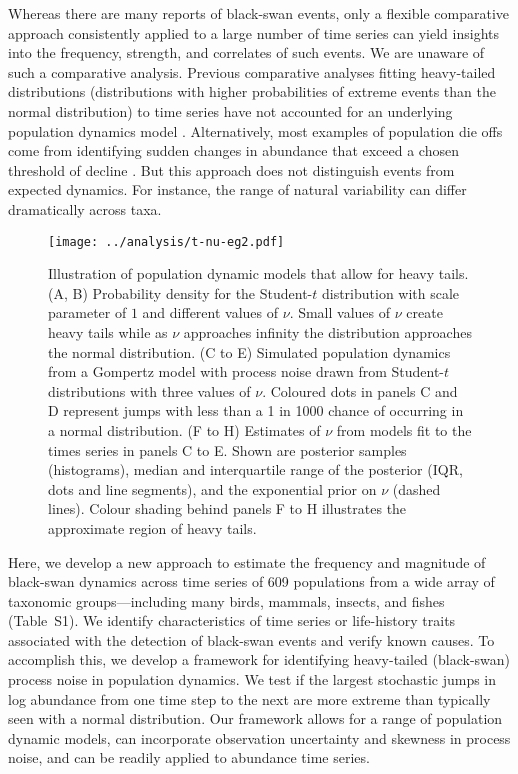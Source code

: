\documentclass[9pt,twocolumn,twoside]{pnas-new}
\begin{document}
Whereas there are many reports of black-swan events,
only a flexible comparative approach consistently applied
to a large number of time series can yield insights into the frequency, strength,
and correlates of such events.
We are unaware of such a comparative analysis.
Previous comparative analyses fitting
heavy-tailed distributions
(distributions with higher probabilities of extreme events
than the normal distribution)
to time series
have not accounted for an underlying population dynamics model
\cite{keitt1998, allen2001, halley2002, segura2013}.
Alternatively, most examples of population die offs come from identifying
sudden changes in abundance that exceed a chosen threshold of decline
\cite{young1994, gerber2001, reed2003, fey2015}.
But this approach
does not distinguish events from
expected dynamics.
For instance, the range of natural variability
can differ dramatically across taxa.

\begin{figure*}[htb]
\centering
\texttt{[image: ../analysis/t-nu-eg2.pdf]}
\caption{Illustration of population dynamic models that allow for heavy
tails. (A, B) Probability density for the Student-$t$
distribution with scale parameter of $1$ and different values of \(\nu\). Small
values of \(\nu\) create heavy tails while as \(\nu\) approaches infinity the
distribution approaches the normal distribution. (C to E)
Simulated population dynamics from a Gompertz model with process noise drawn
from Student-$t$ distributions with three values of \(\nu\). Coloured dots in
panels C and D represent jumps with less than a 1 in 1000
chance of occurring in a normal distribution. (F to H)
Estimates of \(\nu\) from models fit to the times series in panels C to
E. Shown are posterior samples (histograms), median and interquartile
range of the posterior (IQR, dots and line segments), and the exponential prior
on \(\nu\) (dashed lines). Colour shading behind panels F to H
illustrates the approximate region of heavy tails.}
\label{fig:1}
\end{figure*}

Here, we develop a new approach to estimate the frequency and magnitude of
black-swan dynamics across time series of 609 populations from a wide array of
taxonomic groups---including many  birds, mammals, insects, and fishes
(Table~S1). We identify characteristics of time series or
life-history traits associated with the detection of black-swan events and
verify known causes. To accomplish this, we develop a framework for identifying
heavy-tailed (black-swan) process noise in population dynamics.
We test if the largest stochastic jumps in log abundance from one time step to the next
are more extreme than typically seen with a normal distribution. Our framework
allows for a range of population dynamic models, can incorporate observation
uncertainty and skewness in process noise, and can be readily applied to
abundance time series.
\end{document}
